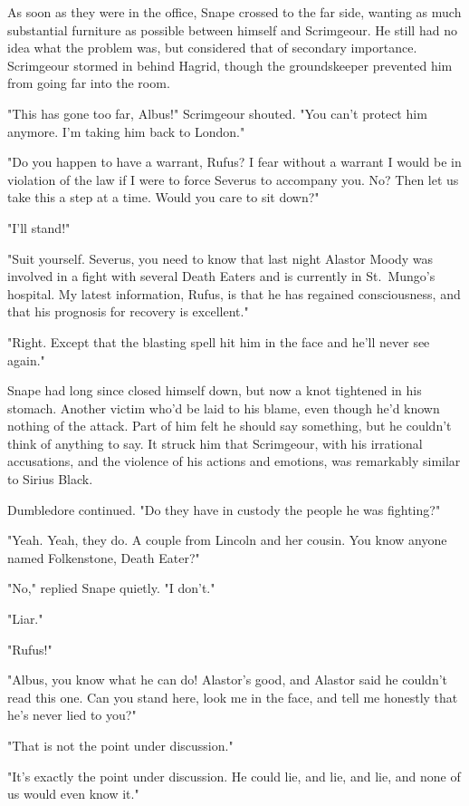As soon as they were in the office, Snape crossed to the far side, wanting as much substantial furniture as possible between himself and Scrimgeour. He still had no idea what the problem was, but considered that of secondary importance. Scrimgeour stormed in behind Hagrid, though the groundskeeper prevented him from going far into the room.

"This has gone too far, Albus!" Scrimgeour shouted. "You can't protect him anymore. I'm taking him back to London."

"Do you happen to have a warrant, Rufus? I fear without a warrant I would be in violation of the law if I were to force Severus to accompany you. No? Then let us take this a step at a time. Would you care to sit down?"

"I'll stand!"

"Suit yourself. Severus, you need to know that last night Alastor Moody was involved in a fight with several Death Eaters and is currently in St.~Mungo's hospital. My latest information, Rufus, is that he has regained consciousness, and that his prognosis for recovery is excellent."

"Right. Except that the blasting spell hit him in the face and he'll never see again."

Snape had long since closed himself down, but now a knot tightened in his stomach. Another victim who'd be laid to his blame, even though he'd known nothing of the attack. Part of him felt he should say something, but he couldn't think of anything to say. It struck him that Scrimgeour, with his irrational accusations, and the violence of his actions and emotions, was remarkably similar to Sirius Black.

Dumbledore continued. "Do they have in custody the people he was fighting?"

"Yeah. Yeah, they do. A couple from Lincoln and her cousin. You know anyone named Folkenstone, Death Eater?"

"No," replied Snape quietly. "I don't."

"Liar."

"Rufus!"

"Albus, you know what he can do! Alastor's good, and Alastor said he couldn't read this one. Can you stand here, look me in the face, and tell me honestly that he's never lied to you?"

"That is not the point under discussion."

"It's exactly the point under discussion. He could lie, and lie, and lie, and none of us would even know it."

